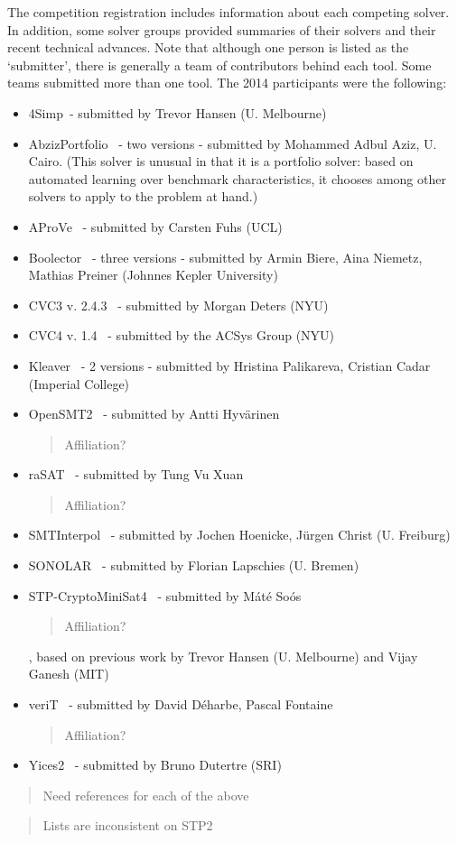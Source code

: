 \documentclass[twosize,11pt]{article}
\newcommand{\comment}[2]{\begin{quote}\sc #1\marginpar{\textcolor{red}{$\ast^{\mbox{#2}}$}}\end{quote}}
\newcommand{\davidc}[1]{\comment{#1}{DC}}
\begin{document}
The competition registration includes information about each competing solver. In addition, some solver groups provided summaries of their solvers and their recent technical advances.
 Note that although one person is listed as the `submitter', there is generally a team of contributors behind each tool. Some teams submitted more than one tool. The 2014 participants were the following:
\begin{itemize}
\item 4Simp~\cite{TBD}- submitted by Trevor Hansen (U. Melbourne)
\item AbzizPortfolio~\cite{TBD} - two versions - submitted by Mohammed Adbul Aziz, U. Cairo. (This solver is unusual in that it is a portfolio solver: based on automated learning over benchmark characteristics, it chooses among other solvers to apply to the problem at hand.)
\item AProVe~\cite{AProVE2014} - submitted by Carsten Fuhs (UCL)
\item Boolector~\cite{TBD} - three versions - submitted by Armin Biere, Aina Niemetz, Mathias Preiner (Johnnes Kepler University)
\item CVC3 v. 2.4.3~\cite{BT07} - submitted by Morgan Deters (NYU)
\item CVC4 v. 1.4~\cite{BCD+11} - submitted by the ACSys Group (NYU)
\item Kleaver~\cite{TBD} - 2 versions - submitted by Hristina Palikareva, Cristian Cadar (Imperial College)
\item OpenSMT2~\cite{TBD} - submitted by Antti Hyv\"arinen \davidc{Affiliation?}
\item raSAT~\cite{TBD} - submitted by Tung Vu Xuan \davidc{Affiliation?}
\item SMTInterpol~\cite{DBLP:conf/spin/ChristHN12,DBLP:conf/spin/2012} - submitted by Jochen Hoenicke, J\"urgen Christ (U. Freiburg)
\item SONOLAR~\cite{TBD} - submitted by Florian Lapschies (U. Bremen)
\item STP-CryptoMiniSat4~\cite{DBLP:conf/cav/GaneshD07,DBLP:conf/cav/2007} - submitted by M\'at\'e So\'os \davidc{Affiliation?}, based on previous work by Trevor Hansen (U. Melbourne) and Vijay Ganesh (MIT)
\item veriT~\cite{TBD} - submitted by David D\'{e}harbe, Pascal Fontaine \davidc{Affiliation?}
\item Yices2~\cite{Dutertre:cav2014} - submitted by Bruno Dutertre (SRI)
\end{itemize}
\davidc{Need references for each of the above}
\davidc{Lists are inconsistent on STP2}
\end{document}
